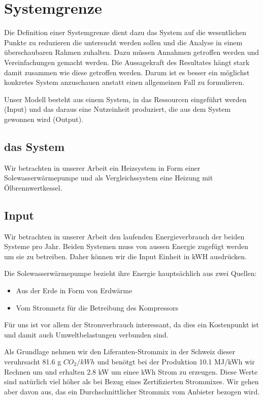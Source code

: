 \chapter{Systemgrenze}
\label{chap:Systemgrenze}

Die Definition einer Systemgrenze dient dazu das System auf die wesentlichen
Punkte zu reduzieren die untersucht werden sollen und die Analyse in einem
überschaubaren Rahmen zuhalten.
Dazu müssen Annahmen getroffen werden und Vereinfachungen gemacht werden.
Die Aussagekraft des Resultates hängt stark damit zusammen wie diese getroffen
werden. Darum ist es besser ein möglichst konkretes System anzuschauen anstatt
einen allgemeinen Fall zu formulieren.

Unser Modell besteht aus einem System, in das Ressourcen eingeführt werden
(Input) und das daraus eine Nutzeinheit produziert, die aus dem System gewonnen
wird (Output).

\section{das System}

Wir betrachten in unserer Arbeit ein Heizsystem in Form einer
Solewasserwärmepumpe und als Vergleichssystem eine Heizung mit
Ölbrennwertkessel.

\section{Input}

Wir betrachten in unserer Arbeit den laufenden Energieverbrauch der beiden
Systeme pro Jahr.
Beiden Systemen muss von aussen Energie zugefügt werden um sie zu betreiben.
Daher können wir die Input Einheit in kWH ausdrücken.

Die Solewasserwärmepumpe bezieht ihre Energie hauptsächlich aus zwei Quellen:
\begin{itemize}
\item Aus der Erde in Form von Erdwärme
\item Vom Stromnetz für die Betreibung des Kompressors
\end{itemize}

Für uns ist vor allem der Stromverbrauch interessant, da dies ein Kostenpunkt
ist und damit auch Umweltbelastungen verbunden sind.

Als Grundlage nehmen wir den Liferanten-Strommix in der Schweiz\cite{bafu:strommix}
dieser veruhrsacht 81.6 g $CO_2 /kWh$
und benötgt bei der Produktion 10.1 MJ/kWh wir Rechnen um
und erhalten 2.8 kW um einee kWh Strom zu erzeugen.
Diese Werte sind natürlich viel höher als bei Bezug eines Zertifizierten 
Strommixes. Wir gehen aber davon aus, das ein Durchschnittlicher Strommix
vom Anbieter bezogen wird.

